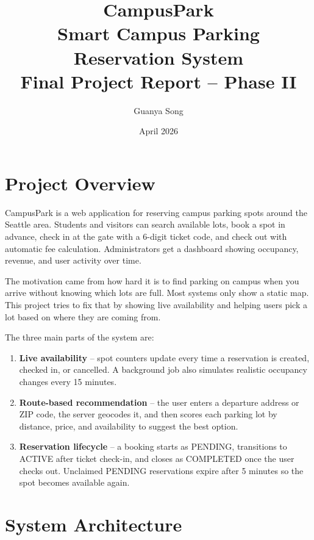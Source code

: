 \documentclass[11pt,letterpaper]{article}
\title{\textbf{CampusPark}\\[4pt]
\large Smart Campus Parking Reservation System\\[2pt]
\normalsize Final Project Report -- Phase II}
\author{Guanya Song}
\date{April 2026}
\begin{document}
\maketitle
\thispagestyle{fancy}

\section{Project Overview}

CampusPark is a web application for reserving campus parking spots around the
Seattle area. Students and visitors can search available lots, book a spot in
advance, check in at the gate with a 6-digit ticket code, and check out with
automatic fee calculation. Administrators get a dashboard showing occupancy,
revenue, and user activity over time.

The motivation came from how hard it is to find parking on campus when you arrive
without knowing which lots are full. Most systems only show a static map. This
project tries to fix that by showing live availability and helping users pick a
lot based on where they are coming from.

The three main parts of the system are:

\begin{enumerate}[leftmargin=1.4em]
  \item \textbf{Live availability} -- spot counters update every time a reservation
        is created, checked in, or cancelled. A background job also simulates
        realistic occupancy changes every 15 minutes.
  \item \textbf{Route-based recommendation} -- the user enters a departure address
        or ZIP code, the server geocodes it, and then scores each parking lot by
        distance, price, and availability to suggest the best option.
  \item \textbf{Reservation lifecycle} -- a booking starts as PENDING,
        transitions to ACTIVE after ticket check-in, and closes as COMPLETED
        once the user checks out. Unclaimed PENDING reservations expire after
        5 minutes so the spot becomes available again.
\end{enumerate}

\section{System Architecture}
\end{document}
